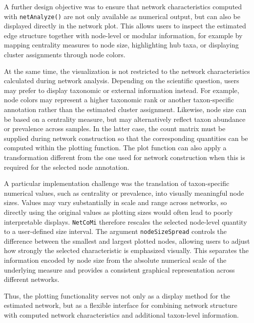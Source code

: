 A further design objective was to ensure that network characteristics computed with \texttt{netAnalyze()} are not only available as numerical output, but can also be displayed directly in the network plot. This allows users to inspect the estimated edge structure together with node-level or modular information, for example by mapping centrality measures to node size, highlighting hub taxa, or displaying cluster assignments through node colors.

At the same time, the visualization is not restricted to the network characteristics calculated during network analysis. Depending on the scientific question, users may prefer to display taxonomic or external information instead. For example, node colors may represent a higher taxonomic rank or another taxon-specific annotation rather than the estimated cluster assignment. Likewise, node size can be based on a centrality measure, but may alternatively reflect taxon abundance or prevalence across samples. In the latter case, the count matrix must be supplied during network construction so that the corresponding quantities can be computed within the plotting function. The plot function can also apply a transformation different from the one used for network construction when this is required for the selected node annotation.

\newpage
A particular implementation challenge was the translation of taxon-specific numerical values, such as centrality or prevalence, into visually meaningful node sizes. Values may vary substantially in scale and range across networks, so directly using the original values as plotting sizes would often lead to poorly interpretable displays. \texttt{NetCoMi} therefore rescales the selected node-level quantity to a user-defined size interval. The argument \texttt{nodeSizeSpread} controls the difference between the smallest and largest plotted nodes, allowing users to adjust how strongly the selected characteristic is emphasized visually. This separates the information encoded by node size from the absolute numerical scale of the underlying measure and provides a consistent graphical representation across different networks.


Thus, the plotting functionality serves not only as a display method for the estimated network, but as a flexible interface for combining network structure with computed network characteristics and additional taxon-level information.

